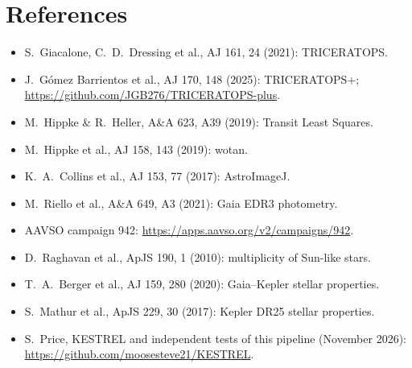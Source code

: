 \documentclass[11pt,a4paper]{report}
\begin{document}
\section*{References}
\begin{itemize}
\item S.~Giacalone, C.~D.~Dressing et al., AJ 161, 24 (2021): TRICERATOPS.
\item J.~G\'omez Barrientos et al., AJ 170, 148 (2025): TRICERATOPS+;
\url{https://github.com/JGB276/TRICERATOPS-plus}.
\item M.~Hippke \& R.~Heller, A\&A 623, A39 (2019): Transit Least Squares.
\item M.~Hippke et al., AJ 158, 143 (2019): wotan.
\item K.~A.~Collins et al., AJ 153, 77 (2017): AstroImageJ.
\item M.~Riello et al., A\&A 649, A3 (2021): Gaia EDR3 photometry.
\item AAVSO campaign 942: \url{https://apps.aavso.org/v2/campaigns/942}.
\item D.~Raghavan et al., ApJS 190, 1 (2010): multiplicity of Sun-like stars.
\item T.~A.~Berger et al., AJ 159, 280 (2020): Gaia--Kepler stellar properties.
\item S.~Mathur et al., ApJS 229, 30 (2017): Kepler DR25 stellar properties.
\item S.~Price, KESTREL and independent tests of this pipeline (November 2026):
\url{https://github.com/moosesteve21/KESTREL}.
\end{itemize}
\end{document}
